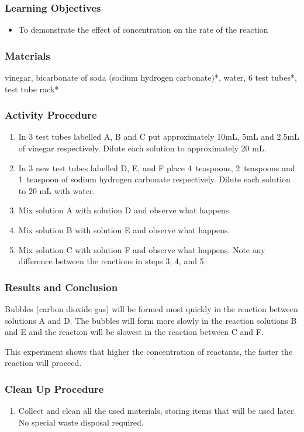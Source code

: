 \subsubsection*{Learning Objectives}
\begin{itemize}
\item{To demonstrate the effect of concentration on the rate of the reaction}
\end{itemize}

\subsubsection*{Materials}
vinegar, bicarbonate of soda (sodium hydrogen carbonate)*, water, 6 test tubes*, test tube rack*

\subsubsection*{Activity Procedure}
\begin{enumerate}
\item{In 3 test tubes labelled A, B and C put approximately 10mL, 5mL and 2.5mL of vinegar respectively. Dilute each solution to approximately 20 mL.}
\item{In 3 new test tubes labelled D, E, and F place 4~teaspoons, 2~teaspoons and 1~teaspoon of sodium hydrogen carbonate respectively. Dilute each solution to 20 mL with water.}
\item{Mix solution A with solution D and observe what happens.}
\item{Mix solution B with solution E and observe what happens.}
\item{Mix solution C with solution F and observe what happens. Note any difference between the reactions in steps 3, 4, and 5.}
\end{enumerate}

\subsubsection*{Results and Conclusion}
Bubbles (carbon dioxide gas) will be formed most quickly in the reaction between solutions A and D. The bubbles will form more slowly in the reaction solutions B and E and the reaction will be slowest in the reaction between C and F. 

This experiment shows that higher the concentration of reactants, the faster the reaction will proceed.

\subsubsection*{Clean Up Procedure}
\begin{enumerate}
\item{Collect and clean all the used materials, storing items that will be used later. No special waste disposal required.}
\end{enumerate}

